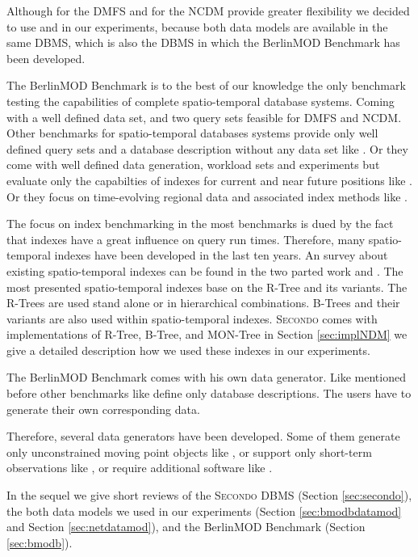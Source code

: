 \documentclass[a4paper]{article}
\newcommand{\secondo}{\textsc{Secondo}}
\newcommand{\bmodb} {BerlinMOD Benchmark}
\begin{document}
Although \cite{STAUPelekis} for the DMFS and \cite{DynamicTransportNetworkDing} for
the NCDM provide greater flexibility we decided to use
\cite{DataModelDataStructureGueting} and \cite{NetworkGueting} in our
experiments, because both data models are available in the same DBMS, which is
also the DBMS in which the \bmodb{} \cite{BerlinMODVLDBDuentgen} has been
developed.

The \bmodb{} \cite{BerlinMODVLDBDuentgen} is to the best of our knowledge the only
benchmark testing the capabilities of complete spatio-temporal database systems.
Coming with a well defined data set, and two query sets feasible for DMFS and NCDM.
Other benchmarks for spatio-temporal databases systems provide only well defined
query sets and a database description without any data set like
\cite{QueriesTheodoridis}.
Or they come with well defined data generation, workload sets and experiments but
evaluate only the capabilties of indexes for current and near future positions like
\cite{COSTBenchmarkJensen}. Or they focus on time-evolving regional data and
associated
index methods like \cite{BenchmarkTzouramanis}.

The focus on index benchmarking in the most benchmarks is dued by the fact that
indexes have a great influence on query run times. Therefore, many spatio-temporal
indexes have been developed in the last ten years. An survey about existing
spatio-temporal
indexes can be found in the two parted work \cite{STAMSurvey1} and
\cite{STAMSurvey2}.
The most presented spatio-temporal indexes base on the R-Tree \cite{RTreeGuttmann}
and its variants. The R-Trees are used stand alone or in hierarchical combinations.
B-Trees \cite{BTreeBayer} and their variants are also used within spatio-temporal
indexes. \secondo{} comes with implementations of R-Tree, B-Tree, and MON-Tree
\cite{MONTreeAlmeidaGeoinformatica} in Section \ref{sec:implNDM} we give a detailed
description how we used these indexes in our experiments.

The \bmodb{} comes with his own data generator. Like mentioned before other
benchmarks like \cite{QueriesTheodoridis} define only database descriptions.
The users have to generate their own corresponding data.

Therefore, several data generators have been developed. Some of them generate
only unconstrained moving point objects like \cite{OportoSaglio}, or support
only short-term observations like \cite{BrinkhoffsDataGenerator}, or require
additional software like \cite{STACTS}.

In the sequel we give short reviews of the \secondo{} DBMS
(Section \ref{sec:secondo}), the both data models we used in our experiments
(Section \ref{sec:bmodbdatamod} and Section \ref{sec:netdatamod}), and the \bmodb{}
(Section \ref{sec:bmodb}).
\end{document}
